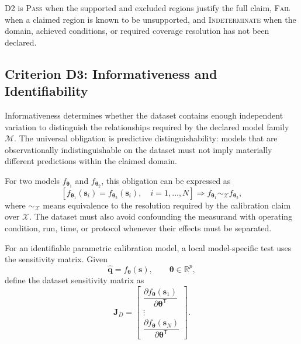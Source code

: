 \documentclass[11pt,a4paper]{article}
\begin{document}
D2 is \textsc{Pass} when the supported and excluded regions justify the full
claim, \textsc{Fail} when a claimed region is known to be unsupported, and
\textsc{Indeterminate} when the domain, achieved conditions, or required
coverage resolution has not been declared.

\subsection{Criterion D3: Informativeness and Identifiability}

Informativeness determines whether the dataset contains enough independent
variation to distinguish the relationships required by the declared model
family $\mathcal{M}$. The universal obligation is predictive
distinguishability: models that are observationally indistinguishable on the
dataset must not imply materially different predictions within the claimed
domain.

For two models $f_{\boldsymbol{\theta}_1}$ and
$f_{\boldsymbol{\theta}_2}$, this obligation can be expressed as
\begin{equation}
    \left[
        f_{\boldsymbol{\theta}_1}(\mathbf{s}_i)
        =
        f_{\boldsymbol{\theta}_2}(\mathbf{s}_i),
        \quad
        i=1,\ldots,N
    \right]
    \Longrightarrow
    f_{\boldsymbol{\theta}_1}
    \sim_{\mathcal{X}}
    f_{\boldsymbol{\theta}_2},
\end{equation}
where $\sim_{\mathcal{X}}$ means equivalence to the resolution required by the
calibration claim over $\mathcal{X}$. The dataset must also avoid confounding
the measurand with operating condition, run, time, or protocol whenever their
effects must be separated.

For an identifiable parametric calibration model, a local model-specific test
uses the sensitivity matrix. Given
\begin{equation}
    \widehat{\mathbf{q}}
    =
    f_{\boldsymbol{\theta}}(\mathbf{s}),
    \qquad
    \boldsymbol{\theta}\in\mathbb{R}^{p},
\end{equation}
define the dataset sensitivity matrix as
\begin{equation}
    \mathbf{J}_D
    =
    \begin{bmatrix}
        \dfrac{\partial f_{\boldsymbol{\theta}}(\mathbf{s}_1)}
              {\partial\boldsymbol{\theta}^{\mathsf{T}}}
        \\
        \vdots
        \\
        \dfrac{\partial f_{\boldsymbol{\theta}}(\mathbf{s}_N)}
              {\partial\boldsymbol{\theta}^{\mathsf{T}}}
    \end{bmatrix}.
\end{equation}
\end{document}
